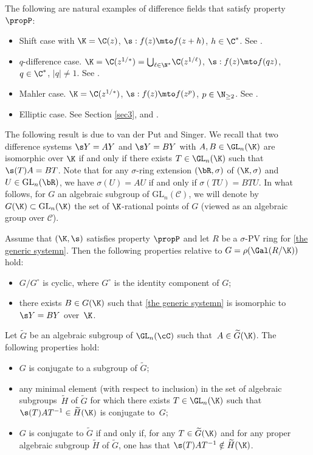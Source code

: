 \begin{example}\label{ex1}
The following are natural examples of difference fields that satisfy property $\propP$:
\begin{itemize}
\item[\textbf{S}:] Shift case with $\K=\C(z)$, $\s: f(z)\mto f(z+h)$, $h\in \C^{*}$. See \cite{Hen98}.
\item[\textbf{Q}:] $q$-difference case. $\K=\C(z^{1/*})= \smash{\bigcup_{\ell \in \N^{*}}} \C(z^{1/\ell})$, $\s: f(z)\mto f(qz)$, $q\in \C^*$, $|q|\neq 1$. See \cite{Hen97}.
\item[\textbf{M}:] Mahler case. $\K=\C(z^{1/*})$, $\s: f(z)\mto f(z^{p})$, $p\in \N_{\geq 2}$. See \cite{roques2018algebraic}.
\item[\textbf{E}:] Elliptic case. See Section \ref{sec3}, and \cite{dreyfus2015galois}.
\end{itemize}
\end{example}
The following result is due to van der Put and Singer. We recall that two difference systems $\s Y=AY$ and $\s Y=BY$ with $A,B \in \GL_{n}(\K)$ are isomorphic over $\K$ if and only if there exists $T \in \GL_{n}(\K)$ such that
$\s(T) A=BT$. Note that for any $\sigma$-ring extension $(\bR,\sigma)$ of $(\K,\sigma)$ and $U\in \mathrm{GL}_{n}(\bR)$, we have $\sigma(U)=AU$ if and only if $\sigma(TU)=BTU$. In what follows, for $G$ an algebraic subgroup of $\mathrm{GL}_{n}(\mathcal{C})$, we will denote by $G(\K)\subset \mathrm{GL}_{n}(\K)$ the set of $\K$-rational points of $G$ (viewed as an algebraic group over $\mathcal{C}$).

\begin{theo}\label{si prop P alors}
Assume that $(\K,\s)$ satisfies property $\propP$ and let $R$ be a $\sigma$-PV ring for \eqref{the generic systemn}.
Then the following properties relative to $G=\rho(\Gal(R/\K))$ hold:
\begin{itemize}
\item $G/G^{\circ}$ is cyclic, where $G^{\circ}$ is the identity component of $G$;
\item there exists $B \in G(\K)$ such that \eqref{the generic systemn} is isomorphic to $\s Y=BY$ over~$\K$.
\end{itemize}
Let $\widetilde{G}$ be an algebraic subgroup of $\GL_{n}(\cC)$ such that~$A\in \widetilde{G}(\K)$. The following properties hold:
\begin{itemize}
\item $G$ is conjugate to a subgroup of $\widetilde{G}$;
\item any minimal element (with respect to inclusion) in the set of algebraic subgroups~$\widetilde{H}$ of $\widetilde{G}$ for which there exists
$T\in \GL_{n}(\K)$ such that $\s(T)AT^{-1}\in \widetilde{H}(\K)$ is conjugate to~$G$;
\item $G$ is conjugate to $\widetilde{G}$ if and only if, for any $T\in \widetilde{G}(\K)$ and for any proper algebraic subgroup $\widetilde{H}$ of $\widetilde{G}$,
one has that $\s(T)AT^{-1}\notin \widetilde{H}(\K)$.
\end{itemize}
\end{theo}

